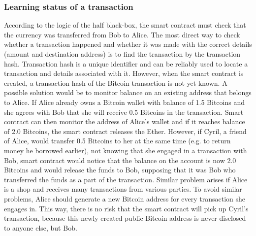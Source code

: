 \subsubsection{Learning status of a transaction}
According to the logic of the half black-box, the smart contract must check that the currency was transferred from Bob to Alice. The most direct way to check whether a transaction happened and whether it was made with the correct details (amount and destination address) is to find the transaction by the transaction hash. Transaction hash is a unique identifier and can be reliably used to locate a transaction and details associated with it. However, when the smart contract is created, a transaction hash of the Bitcoin transaction is not yet known.
% 
A possible solution would be to monitor balance on an existing address that belongs to Alice. If Alice already owns a Bitcoin wallet with balance of 1.5 Bitcoins and she agrees with Bob that she will receive 0.5 Bitcoins in the transaction. Smart contract can then monitor the address of Alice's wallet and if it reaches balance of 2.0 Bitcoins, the smart contract releases the Ether. However, if Cyril, a friend of Alice, would transfer 0.5 Bitcoins to her at the same time (e.g. to return money he borrowed earlier), not knowing that she engaged in a transaction with Bob, smart contract would notice that the balance on the account is now 2.0 Bitcoins and would release the funds to Bob, supposing that it was Bob who transferred the funds as a part of the transaction. Similar problem arises if Alice is a shop and receives many transactions from various parties. To avoid similar problems, Alice should generate a new Bitcoin address for every transaction she engages in. This way, there is no risk that the smart contract will pick up Cyril's transaction, because this newly created public Bitcoin address is never disclosed to anyone else, but Bob\footnotemark.
% 
